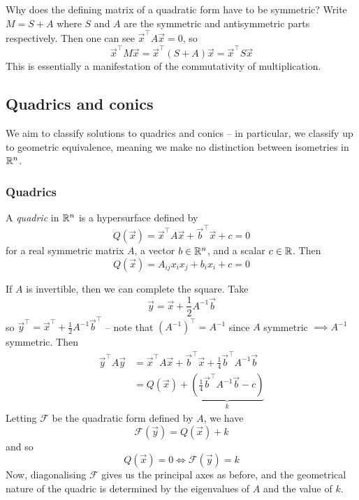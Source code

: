 \documentclass{../template/note}
\begin{document}
    \begin{remark}
        Why does the defining matrix of a quadratic form have to be symmetric? Write \(M = S + A\) where \(S\) and \(A\) are the symmetric and antisymmetric parts respectively. Then one can see \(\vec x^\intercal A \vec x = 0\), so
        \[
            \vec x^\intercal M \vec x = \vec x^\intercal (S + A) \vec x = \vec x^\intercal S \vec x
        \]
        This is essentially a manifestation of the commutativity of multiplication.
    \end{remark}
    
    \subsection{Quadrics and conics}

    We aim to classify solutions to quadrics and conics -- in particular, we classify up to geometric equivalence, meaning we make no distinction between isometries in \(\mathbb R^n\).

    \subsubsection{Quadrics}

    \begin{definition}
        A \emph{quadric} in \(\mathbb R^n\) is a hypersurface defined by
        \[
            Q(\vec x) = \vec x^\intercal A \vec x + \vec b^\intercal \vec x + c = 0
        \]
        for a real symmetric matrix \(A\), a vector \(b \in \mathbb R^n\), and a scalar \(c \in \mathbb R\). Then
        \[
            Q(\vec x) = A_{ij}x_ix_j + b_ix_i + c = 0
        \]
    \end{definition}
    If \(A\) is invertible, then we can complete the square. Take
    \[
        \vec y = \vec x + \frac 1 2 A^{-1} \vec b
    \]
    so \(\vec y^\intercal = \vec x^\intercal + \frac 1 2 A^{-1} \vec b^\intercal\) -- note that \((A^{-1})^\intercal = A^{-1}\) since \(A\) symmetric \(\implies A^{-1}\) symmetric. Then
    \begin{align*}
        \vec y^\intercal A \vec y &= \vec x^\intercal A \vec x + \vec b^\intercal \vec x + \frac{1}{4} \vec b^\intercal A^{-1} \vec b \\
        &= Q(\vec x) + \underbrace{\left(\frac{1}{4} \vec b^\intercal A^{-1} \vec b - c\right)}_k
    \end{align*}
    Letting \(\mathcal F\) be the quadratic form defined by \(A\), we have
    \[
        \mathcal F(\vec y) = Q(\vec x) + k 
    \]
    and so
    \[
        Q(\vec x) = 0 \iff \mathcal F(\vec y) = k
    \]
    Now, diagonalising \(\mathcal F\) gives us the principal axes as before, and the geometrical nature of the quadric is determined by the eigenvalues of \(A\) and the value of \(k\).
\end{document}
